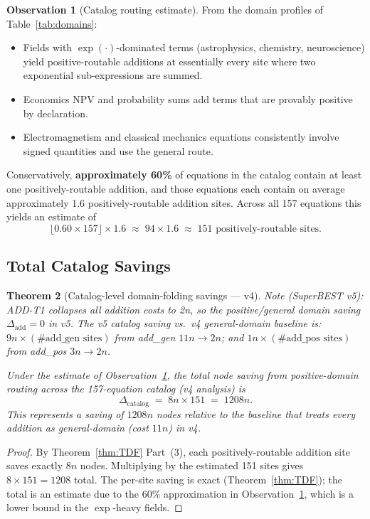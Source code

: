 \documentclass[12pt,a4paper]{article}
\newtheorem{theorem}{Theorem}[section]
\theoremstyle{definition}
\newtheorem{observation}[theorem]{Observation}
\begin{document}
\begin{observation}[Catalog routing estimate]
\label{obs:estimate}
From the domain profiles of Table~\ref{tab:domains}:
\begin{itemize}
  \item Fields with $\exp(\cdot)$-dominated terms (astrophysics, chemistry,
        neuroscience) yield positive-routable additions at essentially every
        site where two exponential sub-expressions are summed.
  \item Economics NPV and probability sums add terms that are
        provably positive by declaration.
  \item Electromagnetism and classical mechanics equations consistently
        involve signed quantities and use the general route.
\end{itemize}
Conservatively, \textbf{approximately 60\%} of equations in the catalog contain
at least one positively-routable addition, and those equations each contain on
average approximately 1.6 positively-routable addition sites.
Across all 157 equations this yields an estimate of
\[
  \lfloor 0.60 \times 157 \rfloor \times 1.6
  \;\approx\; 94 \times 1.6 \;\approx\; 151 \text{ positively-routable sites.}
\]
\end{observation}

\subsection{Total Catalog Savings}

\begin{theorem}[Catalog-level domain-folding savings --- v4]
\label{thm:catalog-savings}
\emph{Note (SuperBEST v5): ADD-T1 collapses all addition costs to 2n, so
the positive/general domain saving $\Delta_{\mathrm{add}} = 0$ in v5.
The v5 catalog saving vs.\ v4 general-domain baseline is:
$9n \times (\text{\# add\_gen sites})$ from add\_gen $11n\to 2n$;
and $1n \times (\text{\# add\_pos sites})$ from add\_pos $3n\to 2n$.}

Under the estimate of Observation~\ref{obs:estimate}, the total node saving
from positive-domain routing across the 157-equation catalog \emph{(v4 analysis)} is
\[
  \Delta_{\mathrm{catalog}} \;=\; 8n \times 151 \;=\; 1208n.
\]
This represents a saving of $1208n$ nodes relative to the baseline that treats
every addition as general-domain (cost $11n$) in v4.
\end{theorem}

\begin{proof}
By Theorem~\ref{thm:TDF} Part~(3), each positively-routable addition site saves
exactly $8n$ nodes.  Multiplying by the estimated 151 sites gives $8 \times 151
= 1208$ total.  The per-site saving is exact (Theorem~\ref{thm:TDF}); the
total is an estimate due to the 60\% approximation in
Observation~\ref{obs:estimate}, which is a lower bound in the
$\exp$-heavy fields.
\end{proof}
\end{document}
